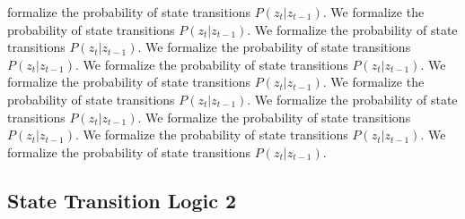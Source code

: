 formalize the probability of state transitions $P(z_t | z_{t-1})$. We formalize the probability of state transitions $P(z_t | z_{t-1})$. We formalize the probability of state transitions $P(z_t | z_{t-1})$. We formalize the probability of state transitions $P(z_t | z_{t-1})$. We formalize the probability of state transitions $P(z_t | z_{t-1})$. We formalize the probability of state transitions $P(z_t | z_{t-1})$. We formalize the probability of state transitions $P(z_t | z_{t-1})$. We formalize the probability of state transitions $P(z_t | z_{t-1})$. We formalize the probability of state transitions $P(z_t | z_{t-1})$. We formalize the probability of state transitions $P(z_t | z_{t-1})$. We formalize the probability of state transitions $P(z_t | z_{t-1})$. 

\subsection{State Transition Logic 2}
